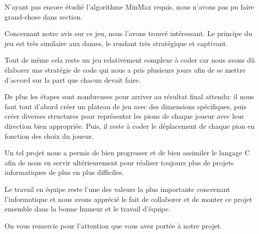 \documentclass[20pt]{report}
\begin{document}
   
   \clearpage
   


   \begin{flushleft}
   \begin{enumerate}
   \Huge 
   \end{enumerate}
   \end{flushleft}
   
   \large
   \parskip=20pt
   		N'ayant pas encore étudié l'algorithme MinMax requis, nous n'avons pas pu faire grand-chose dans section.
    
    \clearpage
  
   \begin{flushleft}
   \begin{enumerate}
   \Huge 
   \end{enumerate}
   \end{flushleft}
     
   \large
   Concernant notre avis sur ce jeu, nous l'avons trouvé intéressant. Le principe du jeu est très similaire aux dames, le rendant très stratégique et captivant.
    \vspace{0.3cm}
     
   Tout de même cela reste un jeu relativement complexe à coder car nous avons dû élaborer une stratégie de code qui nous a pris plusieurs jours afin de se mettre d'accord sur la part que chacun devait faire. 
    \vspace{0.3cm}
    
    De plus les étapes sont nombreuses pour arriver au résultat final attendu: il nous faut tout d'abord créer un plateau de jeu avec des dimensions spécifiques, puis créer diverses structures pour représenter les pions de chaque joueur avec leur direction bien appropriée. Puis, il reste à coder le déplacement de chaque pion en fonction des choix du joueur.
     \vspace{0.3cm}
      
   Un tel projet nous a permis de bien progresser et de bien assimiler le langage C afin de nous en servir ultérieurement pour réaliser toujours plus de projets informatiques de plus en plus difficiles.
    \vspace{0.3cm}
    
   Le travail en équipe reste l'une des valeurs la plus importante concernant l'informatique et nous avons apprécié le fait de collaborer et de monter ce projet ensemble dans la bonne humeur et le travail d'équipe. 
   \vspace{0.3cm}
   
   On vous remercie pour l'attention que vous avez portée à notre projet. 
   
     \clearpage
  
     
\end{document}
